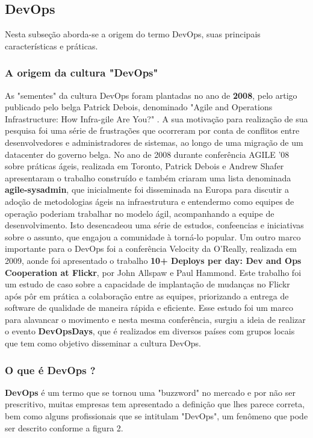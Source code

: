 \documentclass[twoside,english,brazilian]{UNISINOSartigo}
\begin{document}
\subsection{DevOps}
Nesta subseção aborda-se a origem do termo DevOps, suas principais características e práticas.

\subsubsection{A origem da cultura "DevOps"}
As "sementes" da cultura DevOps foram plantadas no ano de \textbf{2008}, pelo artigo publicado pelo belga  Patrick Debois, denominado "Agile and Operations Infrastructure: How Infra-gile Are You?" \citep{Debois2008}. A sua motivação para realização de sua pesquisa foi uma série de frustrações que ocorreram por conta de conflitos entre desenvolvedores e administradores de sistemas, ao longo de uma migração de um datacenter do governo belga.  No ano de 2008 durante conferência AGILE '08 sobre práticas ágeis, realizada em Toronto, Patrick Debois e Andrew Shafer apresentaram o trabalho construído e também criaram uma lista denominada \textbf{agile-sysadmin}, que inicialmente foi disseminada na Europa para discutir a adoção de metodologias ágeis na infraestrutura e entendermo como equipes de operação poderiam trabalhar no modelo ágil, acompanhando a equipe de desenvolvimento. Isto desencadeou uma série de estudos, confeencias e iniciativas sobre o assunto, que engajou a comunidade à torná-lo popular. 
Um outro marco importante para o DevOps foi a conferência Velocity da O'Really, realizada em 2009, aonde foi apresentado o trabalho \textbf{10+ Deploys per day: Dev and Ops Cooperation at Flickr}, por John Allspaw e Paul Hammond. Este trabalho foi um estudo de caso sobre a capacidade de implantação de mudanças no Flickr após pôr em prática a colaboração entre as equipes, priorizando a entrega de software de qualidade de maneira rápida e eficiente.
Esse estudo foi um marco para alavancar o movimento e nesta mesma conferência, surgiu a ideia de realizar o evento \textbf{DevOpsDays}, que é realizados em diversos países com grupos locais que tem como objetivo disseminar a cultura DevOps.

\subsubsection{O que é DevOps ?}

\textbf{DevOps} é um termo que se tornou uma "buzzword" no mercado e  por não ser prescritivo, muitas empresas tem apresentado a definição que lhes parece correta, bem como alguns profissionais que se intitulam "DevOps", um fenômeno que pode ser descrito conforme a figura 2.
\end{document}

